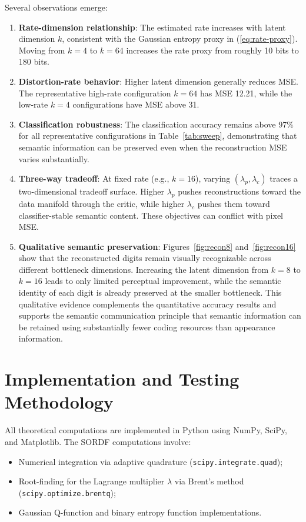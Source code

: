 \documentclass[conference]{IEEEtran}
\begin{document}
Several observations emerge:
\begin{enumerate}
    \item \textbf{Rate-dimension relationship}: The estimated rate increases with latent dimension $k$, consistent with the Gaussian entropy proxy in (\ref{eq:rate-proxy}). Moving from $k=4$ to $k=64$ increases the rate proxy from roughly 10 bits to 180 bits.
    \item \textbf{Distortion-rate behavior}: Higher latent dimension generally reduces MSE. The representative high-rate configuration $k=64$ has MSE 12.21, while the low-rate $k=4$ configurations have MSE above 31.
    \item \textbf{Classification robustness}: The classification accuracy remains above 97\% for all representative configurations in Table~\ref{tab:sweep}, demonstrating that semantic information can be preserved even when the reconstruction MSE varies substantially.
    \item \textbf{Three-way tradeoff}: At fixed rate (e.g., $k=16$), varying $(\lambda_p, \lambda_c)$ traces a two-dimensional tradeoff surface. Higher $\lambda_p$ pushes reconstructions toward the data manifold through the critic, while higher $\lambda_c$ pushes them toward classifier-stable semantic content. These objectives can conflict with pixel MSE.
    \item \textbf{Qualitative semantic preservation}: Figures~\ref{fig:recon8} and~\ref{fig:recon16} show that the reconstructed digits remain visually recognizable across different bottleneck dimensions. Increasing the latent dimension from $k=8$ to $k=16$ leads to only limited perceptual improvement, while the semantic identity of each digit is already preserved at the smaller bottleneck. This qualitative evidence complements the quantitative accuracy results and supports the semantic communication principle that semantic information can be retained using substantially fewer coding resources than appearance information.
\end{enumerate}

\section{Implementation and Testing Methodology}

All theoretical computations are implemented in Python using NumPy, SciPy, and Matplotlib. The SORDF computations involve:
\begin{itemize}
    \item Numerical integration via adaptive quadrature (\texttt{scipy.integrate.quad});
    \item Root-finding for the Lagrange multiplier $\lambda$ via Brent's method (\texttt{scipy.optimize.brentq});
    \item Gaussian Q-function and binary entropy function implementations.
\end{itemize}
\end{document}
